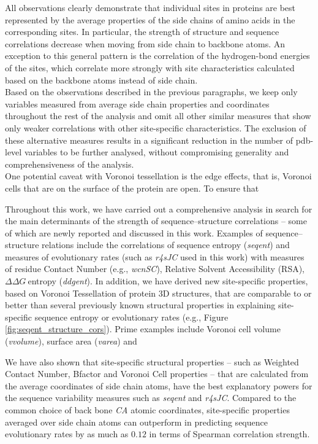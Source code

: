 \documentclass[11pt]{article}
\newcommand{\ddg}{$\Delta\Delta G~$}
\begin{document}
        All observations clearly demonstrate that individual sites in proteins are best represented by the average properties of the side chains of amino acids in the corresponding sites. In particular, the strength of structure and sequence correlations decrease when moving from side chain to backbone atoms. An exception to this general pattern is the correlation of the hydrogen-bond energies of the sites, which correlate more strongly with site characteristics calculated based on the backbone atoms instead of side chain.
        \\

        Based on the observations described in the previous paragraphs, we keep only variables measured from average side chain properties and coordinates throughout the rest of the analysis and omit all other similar measures that show only weaker correlations with other site-specific characteristics. The exclusion of these alternative measures results in a significant reduction in the number of pdb-level variables to be further analysed, without compromising generality and comprehensiveness of the analysis.
        \\

		One potential caveat with Voronoi tessellation is the edge effects, that is, Voronoi cells that are on the surface of the protein are open. To ensure that 
        
        Throughout this work, we have carried out a comprehensive analysis in search for the main determinants of the strength of sequence--structure correlations -- some of which are newly reported and discussed in this work. Examples of sequence--structure relations include the correlations of sequence entropy ({\it seqent}) and measures of evolutionary rates (such as {\it r4sJC} used in this work) with measures of residue Contact Number (e.g., {\it wcnSC}), Relative Solvent Accessibility (RSA), \ddg entropy ({\it ddgent}). In addition, we have derived new site-specific properties, based on Voronoi Tessellation of protein 3D structures, that are comparable to or better than several previously known structural properties in explaining site-specific sequence entropy or evolutionary rates (e.g., Figure \ref{fig:seqent_structure_cors}). Prime examples include Voronoi cell volume ({\it vvolume}), surface area ({\it varea}) and 
        
        
         We have also shown that site-specific structural properties -- such as Weighted Contact Number, Bfactor and Voronoi Cell properties -- that are calculated from the average coordinates of side chain atoms, have the best explanatory powers for the sequence variability measures such as {\it seqent} and {\it r4sJC}. Compared to the common choice of back bone {\it CA} atomic coordinates, site-specific properties averaged over side chain atoms can outperform in predicting sequence evolutionary rates by as much as $0.12$ in terms of Spearman correlation strength.
\end{document}
